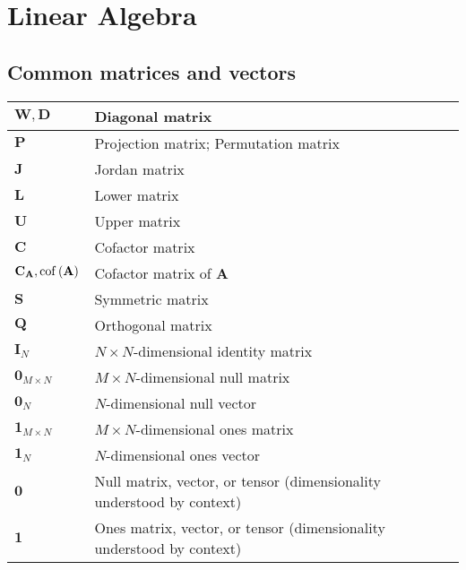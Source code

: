 \documentclass{article}
\begin{document}
\section{Linear Algebra}
\subsection{Common matrices and vectors}
\begin{xltabular}{\textwidth}{XX}
	\(\mathbf{W}, \mathbf{D}\)                  & Diagonal matrix                                                       \\ \hline
	\(\mathbf{P}\)                              & Projection matrix; Permutation matrix                                 \\ \hline
	\(\mathbf{J}\)                              & Jordan matrix                                                         \\ \hline
	\(\mathbf{L}\)                              & Lower matrix                                                          \\ \hline
	\(\mathbf{U}\)                              & Upper matrix                                                          \\ \hline
	\(\mathbf{C}\)                              & Cofactor matrix                                                       \\ \hline
	\(\mathbf{C}_\mathbf{A}, \operatorname{cof}\left(\mathbf{A}\right)\) & Cofactor matrix of \(\mathbf{A}\)                                     \\ \hline
	\(\mathbf{S}\)                              & Symmetric matrix                                                      \\ \hline
	\(\mathbf{Q}\)                              & Orthogonal matrix                                                     \\ \hline
	\(\mathbf{I}_N\)                            & \(N\times N\)-dimensional identity matrix                             \\ \hline
	\(\mathbf{0}_{M\times N}\)                  & \(M\times N\)-dimensional null matrix                                 \\ \hline
	\(\mathbf{0}_{N}\)                          & \(N\)-dimensional null vector                                         \\ \hline
	\(\mathbf{1}_{M\times N}\)                  & \(M\times N\)-dimensional ones matrix                                 \\ \hline
	\(\mathbf{1}_{N}\)                          & \(N\)-dimensional ones vector                                         \\ \hline
	\(\mathbf{0}\)                              & Null matrix, vector, or tensor (dimensionality understood by context) \\ \hline
	\(\mathbf{1}\)                              & Ones matrix, vector, or tensor (dimensionality understood by context) \\
\end{xltabular}
\end{document}
